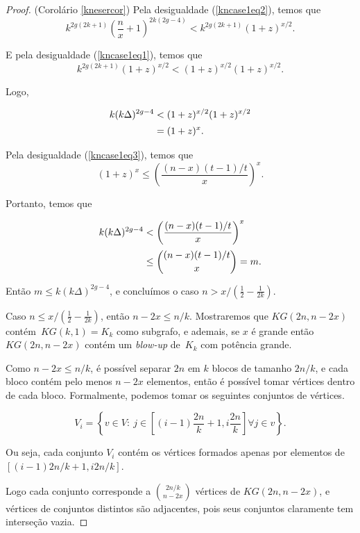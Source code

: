 \begin{proof}{(Corolário \ref{knesercor})}
Pela desigualdade (\ref{kncase1eq2}), temos que \[k^{2g(2k+1)}\left(\frac{n}{x}+1\right)^{2k(2g-4)}< k^{2g(2k+1)}\left(1+z\right)^{x/2}.\]

E pela desigualdade (\ref{kncase1eq1}), temos que \[k^{2g(2k+1)}\left(1+z\right)^{x/2} < (1+z)^{x/2}(1+z)^{x/2}.\]

Logo,

\begin{equation*}
\setlength{\jot}{5pt}
\begin{aligned}
k(k\Delta)^{2g-4} & < (1+z)^{x/2}(1+z)^{x/2} \\
& = (1+z)^x.
\end{aligned}
\end{equation*}

Pela desigualdade (\ref{kncase1eq3}), temos que \[(1+z)^x \leq \left(\frac{(n-x)(t-1)/t}{x}\right)^x.\]

Portanto, temos que

\begin{equation*}
\setlength{\jot}{5pt}
\begin{aligned}
k(k\Delta)^{2g-4} & < \left(\frac{(n-x)(t-1)/t}{x}\right)^x \\
 & \leq \binom{(n-x)(t-1)/t}{x} = m.
\end{aligned}
\end{equation*}

Então $m \leq k(k\Delta)^{2g-4}$, e concluímos o caso $n > x/(\frac{1}{2} - \frac{1}{2k})$.

Caso $n \leq x/(\frac{1}{2} - \frac{1}{2k})$, então $n-2x \leq n/k$. Mostraremos que $KG(2n,n-2x)$ contém~$KG(k,1) = K_k$ como subgrafo, e ademais, se $x$ é grande então $KG(2n,n-2x)$ contém um \textit{blow-up} de~$K_k$ com potência grande.

Como $n-2x \leq n/k$, é possível separar $2n$ em $k$ blocos de tamanho $2n/k$, e cada bloco contém pelo menos $n-2x$ elementos, então é possível tomar vértices dentro de cada bloco. Formalmente, podemos tomar os seguintes conjuntos de vértices.

\[V_i = \left\{v \in V : \ j \in \left[(i-1)\frac{2n}{k}+1, i\frac{2n}{k}\right]\forall j \in v\right\}.\]

Ou seja, cada conjunto $V_i$ contém os vértices formados apenas por elementos de $[(i-1)2n/k+1, i2n/k]$.

Logo cada conjunto corresponde a $\binom{2n/k}{n-2x}$ vértices de $KG(2n, n-2x)$, e vértices de conjuntos distintos são adjacentes, pois seus conjuntos claramente tem interseção vazia.


\end{proof}
